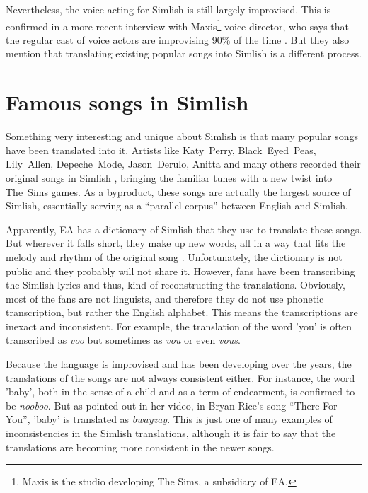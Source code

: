 \documentclass[11pt]{article}
\begin{document}
Nevertheless, the voice acting for Simlish is still largely improvised. This is confirmed in a more recent interview with Maxis\footnote{Maxis is the studio developing The Sims, a subsidiary of EA.} voice director, who says that the regular cast of voice actors are improvising 90\% of the time \cite{bassi2023how}. But they also mention that translating existing popular songs into Simlish is a different process.

\section*{Famous songs in Simlish}

Something very interesting and unique about Simlish is that many popular songs have been translated into it. Artists like Katy~Perry, Black~Eyed~Peas, Lily~Allen, Depeche~Mode, Jason~Derulo, Anitta and many others recorded their original songs in Simlish \cite{wiki2025songs}, bringing the familiar tunes with a new twist into The~Sims games. As a byproduct, these songs are actually the largest source of Simlish, essentially serving as a ``parallel corpus'' between English and Simlish.

Apparently, EA has a dictionary of Simlish that they use to translate these songs. But wherever it falls short, they make up new words, all in a way that fits the melody and rhythm of the original song \cite{bassi2023how}. Unfortunately, the dictionary is not public and they probably will not share it. However, fans have been transcribing the Simlish lyrics and thus, kind of reconstructing the translations. Obviously, most of the fans are not linguists, and therefore they do not use phonetic transcription, but rather the English alphabet. This means the transcriptions are inexact and inconsistent. For example, the translation of the word 'you' is often transcribed as \textit{voo} but sometimes as \textit{vou} or even \textit{vous}.  

Because the language is improvised and has been developing over the years, the translations of the songs are not always consistent either. For instance, the word 'baby', both in the sense of a child and as a term of endearment, is confirmed to be \textit{nooboo}. But as \cite{kirce2024language} pointed out in her video, in Bryan Rice's song ``There For You'', 'baby' is translated as \textit{bwayzay}. This is just one of many examples of inconsistencies in the Simlish translations, although it is fair to say that the translations are becoming more consistent in the newer songs.
\end{document}
